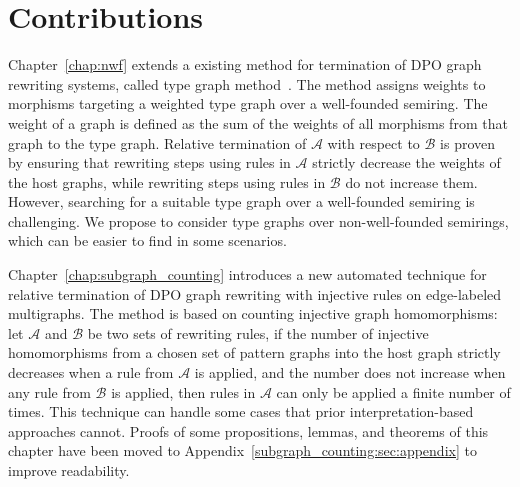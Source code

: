 \section{Contributions}
Chapter~\ref{chap:nwf} extends a existing method for termination of DPO graph rewriting systems, called type graph method~\cite{zantema2014termination,bruggink2014termination,bruggink2015proving,endrullis2024generalized_icgt}. 
The method assigns weights to morphisms targeting a weighted type graph over a well-founded semiring. The weight of a graph is defined
 as the sum of the weights of all morphisms from that graph to the type graph. Relative termination of $\mathcal{A}$ with respect to $\mathcal{B}$ is proven by ensuring that rewriting steps using rules in \( \mathcal{A} \) strictly decrease the weights of the host graphs, while rewriting steps using rules in \( \mathcal{B} \) do not increase them. However, searching for a suitable type graph over a well-founded semiring is challenging. We propose to consider type graphs over non-well-founded semirings, which can be easier to find in some scenarios. 

Chapter~\ref{chap:subgraph_counting} introduces a new automated technique for relative termination of DPO graph rewriting with injective rules on edge-labeled multigraphs.
The method is based on counting injective graph homomorphisms: let $\mathcal{A}$ and $\mathcal{B}$ be two sets of rewriting rules, if the number of injective homomorphisms from a chosen set of pattern graphs into the host graph strictly decreases when a rule from $\mathcal{A}$ is applied, and the number does not increase when any rule from $\mathcal{B}$ is applied, then rules in $\mathcal{A}$ can only be applied a finite number of times. This technique can handle some cases that prior interpretation-based approaches cannot.
Proofs of some propositions, lemmas, and theorems of this chapter
 have been moved to Appendix~\ref{subgraph_counting:sec:appendix} to improve readability.

